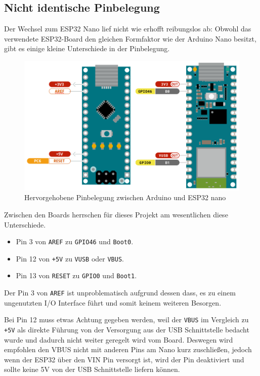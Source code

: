 \subsection{Nicht identische Pinbelegung}
\label{subsec:arduino_to_esp32}
Der Wechsel zum ESP32 Nano lief nicht wie erhofft reibungslos ab:
Obwohl das verwendete ESP32-Board den gleichen Formfaktor wie der Arduino Nano besitzt,
gibt es einige kleine Unterschiede in der Pinbelegung.

\begin{figure}[H]
    \includegraphics[width=\textwidth, center]{img/nano-differences-m.png}
    \caption{Hervorgehobene Pinbelegung zwischen Arduino und ESP32 nano}
    \label{fig:nano_boards}
\end{figure}

Zwischen den Boards herrschen für dieses Projekt am wesentlichen diese Unterschiede.
\begin{itemize}
    \item Pin 3 von \texttt{AREF} zu \texttt{GPIO46} und \texttt{Boot0}.
    \item Pin 12 von \texttt{+5V} zu \texttt{VUSB} oder \texttt{VBUS}.
    \item Pin 13 von \texttt{RESET} zu \texttt{GPIO0} und \texttt{Boot1}.
\end{itemize}

Der Pin 3 von \texttt{AREF} ist unproblematisch aufgrund dessen dass,
es zu einem ungenutzten I/O Interface führt und somit keinem weiteren Besorgen.

Bei Pin 12 muss etwas Achtung gegeben werden, weil der \texttt{VBUS} im Vergleich zu \texttt{+5V} als
direkte Führung von der Versorgung aus der USB Schnittstelle bedacht wurde und 
dadurch nicht weiter geregelt wird vom Board. Deswegen wird empfohlen den VBUS 
nicht mit anderen Pins am Nano kurz zuschließen, jedoch wenn der ESP32 über den VIN Pin versorgt ist, 
wird der Pin deaktiviert und sollte keine 5V von der USB Schnittstelle liefern können. 

